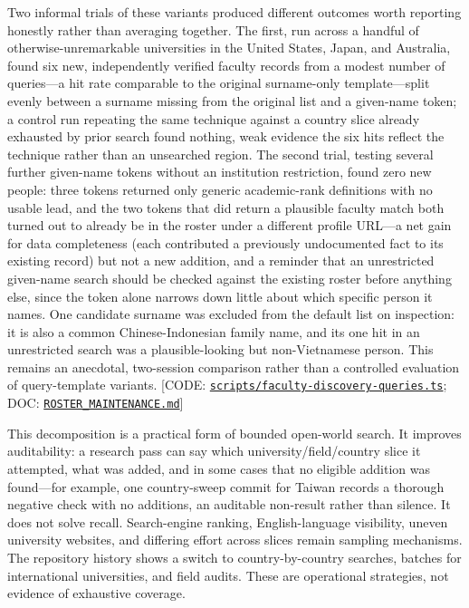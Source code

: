\documentclass[11pt]{article}
\newcommand{\code}[1]{\texttt{\small #1}}
\newcommand{\ghrepo}{https://github.com/dynaroars/vietprofs}
\newcommand{\codelink}[1]{\href{\ghrepo/blob/main/#1}{\code{#1}}}
\newcommand{\codelinkd}[2]{\href{\ghrepo/blob/main/#1}{\code{#2}}}
\begin{document}
Two informal trials of these variants produced different outcomes worth reporting honestly rather than averaging together. The first, run across a handful of otherwise-unremarkable universities in the United States, Japan, and Australia, found six new, independently verified faculty records from a modest number of queries---a hit rate comparable to the original surname-only template---split evenly between a surname missing from the original list and a given-name token; a control run repeating the same technique against a country slice already exhausted by prior search found nothing, weak evidence the six hits reflect the technique rather than an unsearched region. The second trial, testing several further given-name tokens without an institution restriction, found zero new people: three tokens returned only generic academic-rank definitions with no usable lead, and the two tokens that did return a plausible faculty match both turned out to already be in the roster under a different profile URL---a net gain for data completeness (each contributed a previously undocumented fact to its existing record) but not a new addition, and a reminder that an unrestricted given-name search should be checked against the existing roster before anything else, since the token alone narrows down little about which specific person it names. One candidate surname was excluded from the default list on inspection: it is also a common Chinese-Indonesian family name, and its one hit in an unrestricted search was a plausible-looking but non-Vietnamese person. This remains an anecdotal, two-session comparison rather than a controlled evaluation of query-template variants.
[CODE: \codelink{scripts/faculty-discovery-queries.ts}; DOC:
\codelinkd{ROSTER_MAINTENANCE.md}{ROSTER\_MAINTENANCE.md}]

This decomposition is a practical form of bounded open-world search.
It improves auditability: a research pass can say which university/field/country slice it attempted, what was added, and in some cases that no eligible addition was found---for example, one country-sweep commit for Taiwan records a thorough negative check with no additions, an auditable non-result rather than silence.
It does not solve recall.
Search-engine ranking, English-language visibility, uneven university websites, and differing effort across slices remain sampling mechanisms.
The repository history shows a switch to country-by-country searches, batches for international universities, and field audits.
These are operational strategies, not evidence of exhaustive coverage.
\end{document}
